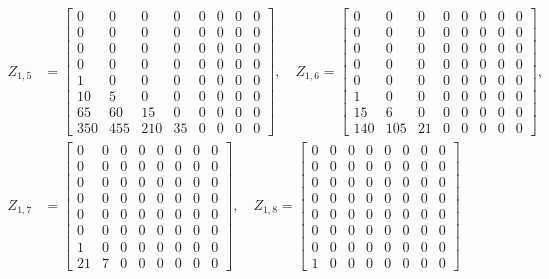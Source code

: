\begin{displaymath}
\begin{split}
Z_{1,5} &= \left[\begin{matrix}0 & 0 & 0 & 0 & 0 & 0 & 0 & 0\\0 & 0 & 0 & 0 & 0 & 0 & 0 & 0\\0 & 0 & 0 & 0 & 0 & 0 & 0 & 0\\0 & 0 & 0 & 0 & 0 & 0 & 0 & 0\\1 & 0 & 0 & 0 & 0 & 0 & 0 & 0\\10 & 5 & 0 & 0 & 0 & 0 & 0 & 0\\65 & 60 & 15 & 0 & 0 & 0 & 0 & 0\\350 & 455 & 210 & 35 & 0 & 0 & 0 & 0\end{matrix}\right], \quad Z_{1,6} = \left[\begin{matrix}0 & 0 & 0 & 0 & 0 & 0 & 0 & 0\\0 & 0 & 0 & 0 & 0 & 0 & 0 & 0\\0 & 0 & 0 & 0 & 0 & 0 & 0 & 0\\0 & 0 & 0 & 0 & 0 & 0 & 0 & 0\\0 & 0 & 0 & 0 & 0 & 0 & 0 & 0\\1 & 0 & 0 & 0 & 0 & 0 & 0 & 0\\15 & 6 & 0 & 0 & 0 & 0 & 0 & 0\\140 & 105 & 21 & 0 & 0 & 0 & 0 & 0\end{matrix}\right], \\
Z_{1,7} &= \left[\begin{matrix}0 & 0 & 0 & 0 & 0 & 0 & 0 & 0\\0 & 0 & 0 & 0 & 0 & 0 & 0 & 0\\0 & 0 & 0 & 0 & 0 & 0 & 0 & 0\\0 & 0 & 0 & 0 & 0 & 0 & 0 & 0\\0 & 0 & 0 & 0 & 0 & 0 & 0 & 0\\0 & 0 & 0 & 0 & 0 & 0 & 0 & 0\\1 & 0 & 0 & 0 & 0 & 0 & 0 & 0\\21 & 7 & 0 & 0 & 0 & 0 & 0 & 0\end{matrix}\right], \quad Z_{1,8} = \left[\begin{matrix}0 & 0 & 0 & 0 & 0 & 0 & 0 & 0\\0 & 0 & 0 & 0 & 0 & 0 & 0 & 0\\0 & 0 & 0 & 0 & 0 & 0 & 0 & 0\\0 & 0 & 0 & 0 & 0 & 0 & 0 & 0\\0 & 0 & 0 & 0 & 0 & 0 & 0 & 0\\0 & 0 & 0 & 0 & 0 & 0 & 0 & 0\\0 & 0 & 0 & 0 & 0 & 0 & 0 & 0\\1 & 0 & 0 & 0 & 0 & 0 & 0 & 0\end{matrix}\right]\\
\end{split}
\end{displaymath}

